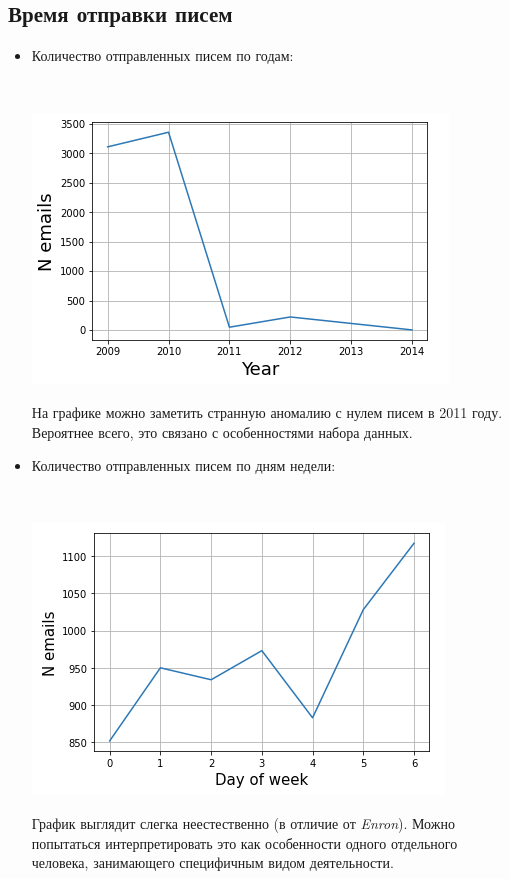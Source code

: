 \subsection{Время отправки писем}

\begin{itemize}

\item Количество отправленных писем по годам:

$ $

\includegraphics[scale=0.8]{pics/year.png}

На графике можно заметить странную аномалию с нулем писем в 2011 году. Вероятнее всего, это связано с особенностями набора данных. 

\item Количество отправленных писем по дням недели:

$ $

\includegraphics[scale=0.8]{pics/week.png}

График выглядит слегка неестественно (в отличие от \textit{Enron}). Можно попытаться интерпретировать это как особенности одного отдельного человека, занимающего специфичным видом деятельности.
\end{itemize}

